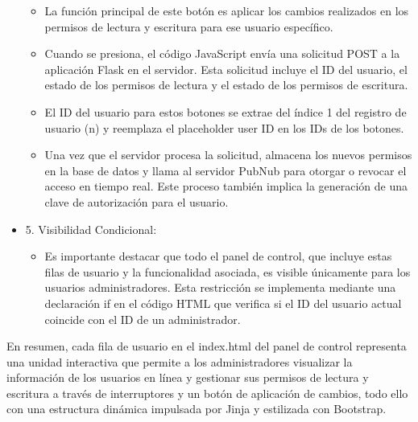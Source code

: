 \documentclass{report}
\begin{document}
\begin{itemize}
\begin{itemize}
            \item La función principal de este botón es aplicar los cambios realizados en los permisos de lectura y escritura para ese usuario específico.
            \item Cuando se presiona, el código JavaScript envía una solicitud POST a la aplicación Flask en el servidor. Esta solicitud incluye 
            el ID del usuario, el estado de los permisos de lectura y el estado de los permisos de escritura.
            \item El ID del usuario para estos botones se extrae del índice 1 del registro de usuario (n) y reemplaza el placeholder user ID en los 
            IDs de los botones.
            \item Una vez que el servidor procesa la solicitud, almacena los nuevos permisos en la base de datos y llama al servidor PubNub para 
            otorgar o revocar el acceso en tiempo real. Este proceso también implica la generación de una clave de autorización para el usuario.
        \end{itemize}
    \item 5. Visibilidad Condicional:
        \begin{itemize}
            \item Es importante destacar que todo el panel de control, que incluye estas filas de usuario y la funcionalidad asociada, es 
            visible únicamente para los usuarios administradores. Esta restricción se implementa mediante una declaración if en el código HTML 
            que verifica si el ID del usuario actual coincide con el ID de un administrador.
        \end{itemize}
\end{itemize}
En resumen, cada fila de usuario en el index.html del panel de control representa una unidad interactiva que permite a los administradores 
visualizar la información de los usuarios en línea y gestionar sus permisos de lectura y escritura a través de interruptores y un botón de 
aplicación de cambios, todo ello con una estructura dinámica impulsada por Jinja y estilizada con Bootstrap.
\end{document}
